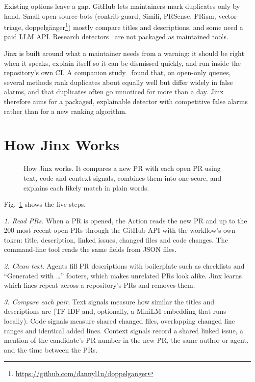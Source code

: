 \documentclass[sigconf]{acmart}
\begin{document}
Existing options leave a gap. GitHub lets maintainers mark duplicates only by hand. Small open-source bots (contrib-guard, Simili, PRSense, PRism, vector-triage, doppelg\"anger\footnote{\url{https://github.com/dannyl1u/doppelganger}}) mostly compare titles and descriptions, and some need a paid LLM API. Research detectors~\cite{li2017detecting,ren2019intrude,wang2019time,jiang2023duphunter,liao2024dupllm} are not packaged as maintained tools.

Jinx is built around what a maintainer needs from a warning: it should be right when it speaks, explain itself so it can be dismissed quickly, and run inside the repository's own CI. A companion study~\cite{jinxstudy} found that, on open-only queues, several methods rank duplicates about equally well but differ widely in false alarms, and that duplicates often go unnoticed for more than a day. Jinx therefore aims for a packaged, explainable detector with competitive false alarms rather than for a new ranking algorithm.

\section{How Jinx Works}
\begin{figure}[t]\centering\resizebox{0.95\textwidth}{!}{}
\caption{How Jinx works. It compares a new PR with each open PR using text, code and context signals, combines them into one score, and explains each likely match in plain words.}\label{fig:arch}\end{figure}

Fig.~\ref{fig:arch} shows the five steps.

\emph{1. Read PRs.} When a PR is opened, the Action reads the new PR and up to the 200 most recent open PRs through the GitHub API with the workflow's own token: title, description, linked issues, changed files and code changes. The command-line tool reads the same fields from JSON files.

\emph{2. Clean text.} Agents fill PR descriptions with boilerplate such as checklists and ``Generated with \ldots'' footers, which makes unrelated PRs look alike. Jinx learns which lines repeat across a repository's PRs and removes them.

\emph{3. Compare each pair.} Text signals measure how similar the titles and descriptions are (TF-IDF and, optionally, a MiniLM embedding that runs locally). Code signals measure shared changed files, overlapping changed line ranges and identical added lines. Context signals record a shared linked issue, a mention of the candidate's PR number in the new PR, the same author or agent, and the time between the PRs.
\end{document}
